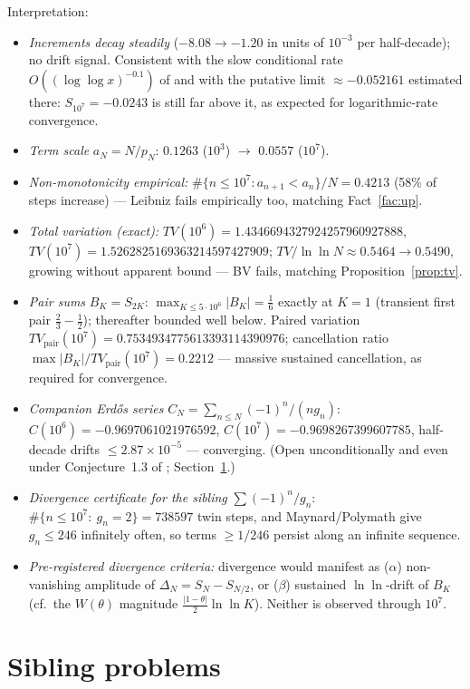 \documentclass[11pt]{article}
\theoremstyle{definition}
\begin{document}
Interpretation:
\begin{itemize}\itemsep2pt
\item \emph{Increments decay steadily} ($-8.08\to-1.20$ in units of $10^{-3}$ per half-decade); no drift signal. Consistent with the slow conditional rate $O((\log\log x)^{-0.1})$ of \cite{Ta23} and with the putative limit $\approx-0.052161$ estimated there: $S_{10^7}=-0.0243$ is still far above it, as expected for logarithmic-rate convergence.
\item \emph{Term scale} $a_N=N/p_N$: $0.1263$ ($10^3$) $\to$ $0.0557$ ($10^7$).
\item \emph{Non-monotonicity empirical:} $\#\{n\le10^7: a_{n+1}<a_n\}/N=0.4213$ (58\% of steps increase) --- Leibniz fails empirically too, matching Fact~\ref{fac:up}.
\item \emph{Total variation (exact):} $TV(10^6)=1.4346694327924257960927888$, $TV(10^7)=1.5262825169363214597427909$; $TV/\ln\ln N\approx0.5464\to0.5490$, growing without apparent bound --- BV fails, matching Proposition~\ref{prop:tv}.
\item \emph{Pair sums} $B_K=S_{2K}$: $\max_{K\le5\cdot10^6}|B_K|=\tfrac16$ exactly at $K=1$ (transient first pair $\tfrac23-\tfrac12$); thereafter bounded well below. Paired variation $TV_{\mathrm{pair}}(10^7)=0.7534934775613393114390976$; cancellation ratio $\max|B_K|/TV_{\mathrm{pair}}(10^7)=0.2212$ --- massive sustained cancellation, as required for convergence.
\item \emph{Companion Erd\H{o}s series} $C_N=\sum_{n\le N}(-1)^n/(ng_n)$: $C(10^6)=-0.9697061021976592$, $C(10^7)=-0.9698267399607785$, half-decade drifts $\le2.87\times10^{-5}$ --- converging. (Open unconditionally and even under Conjecture~1.3 of \cite{Ta23}; Section~\ref{sec:sib}.)
\item \emph{Divergence certificate for the sibling} $\sum(-1)^n/g_n$: $\#\{n\le10^7:\ g_n=2\}=738597$ twin steps, and Maynard/Polymath give $g_n\le246$ infinitely often, so terms $\ge1/246$ persist along an infinite sequence.
\item \emph{Pre-registered divergence criteria:} divergence would manifest as ($\alpha$) non-vanishing amplitude of $\Delta_N=S_N-S_{N/2}$, or ($\beta$) sustained $\ln\ln$-drift of $B_K$ (cf.\ the $W(\theta)$ magnitude $\frac{|1-\theta|}{2}\ln\ln K$). Neither is observed through $10^7$.
\end{itemize}

\section{Sibling problems}\label{sec:sib}
\end{document}
